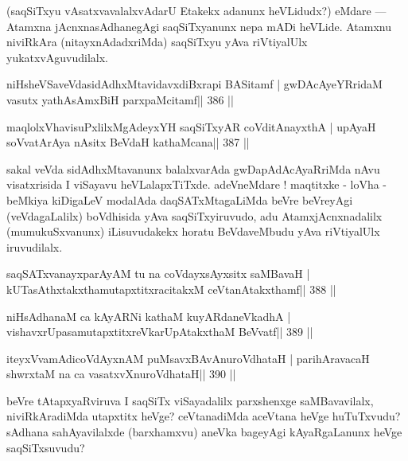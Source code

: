 \begin{artha}
(saqSiTxyu vAsatxvavalalxvAdarU Etakekx adanunx heVLidudx?) eMdare  {\rm ---}  
Atamxna jAcnxnasAdhanegAgi saqSiTxyanunx nepa mADi heVLide. Atamxnu niviRkAra (nitayxnAdadxriMda) saqSiTxyu yAva riVtiyalUlx yukatxvAguvudilalx.
\end{artha}


\begin{shl}
niHsheVSaveVdasidAdhxMtavidavxdiBxrapi BASitamf |
gwDAcAyeYRridaM vasutx yathA\s sAmxBiH parxpaMcitamf\hfill || 386 ||
\end{shl}

\begin{shl}
maqlolxVhavisuPxlilxMgAdeyxYH saqSiTxyAR coVditA\s nayxthA |
upAyaH soV\s vatArAya nAsitx BeVdaH kathaMcana\hfill || 387 ||
\end{shl}

\begin{artha}
sakal veVda sidAdhxMtavanunx balalxvarAda gwDapAdAcAyaRriMda nAvu  visatxrisida I viSayavu heVLalapxTiTxde. adeVneMdare ! maqtitxke -  loVha - beMkiya kiDigaLeV modalAda daqSATxMtagaLiMda beVre beVreyAgi (veVdagaLalilx) boVdhisida yAva saqSiTxyiruvudo, adu AtamxjAcnxnadalilx (mumukuSxvanunx) iLisuvudakekx horatu BeVdaveMbudu yAva riVtiyalUlx iruvudilalx.
\end{artha}

\begin{shl}
saqSATxvanayxparAyAM tu na coVdayxsAyxsitx saMBavaH |
kUTasAthxtakxthamutapxtitxracitakxM ceVtanAtakxthamf\hfill || 388 ||
\end{shl}

\begin{shl}
niHsAdhanaM ca kAyARNi kathaM kuyARdaneVkadhA |
vishavxrUpasamutapxtitxreVkarUpAtakxthaM BeVvatf\hfill || 389 ||
\end{shl}

\begin{shl}
iteyxVvamAdicoVdAyxnAM puMsavxBAvAnuroVdhataH |
parihAravacaH shwrxtaM na ca vasatxvXnuroVdhataH\hfill || 390 ||
\end{shl}

\begin{artha}
beVre tAtapxyaRviruva I saqSiTx viSayadalilx parxshenxge saMBavavilalx, niviRkAradiMda utapxtitx heVge? ceVtanadiMda aceVtana heVge huTuTxvudu? sAdhana sahAyavilalxde (barxhamxvu) aneVka bageyAgi kAyaRgaLanunx heVge saqSiTxsuvudu?
\end{artha}

